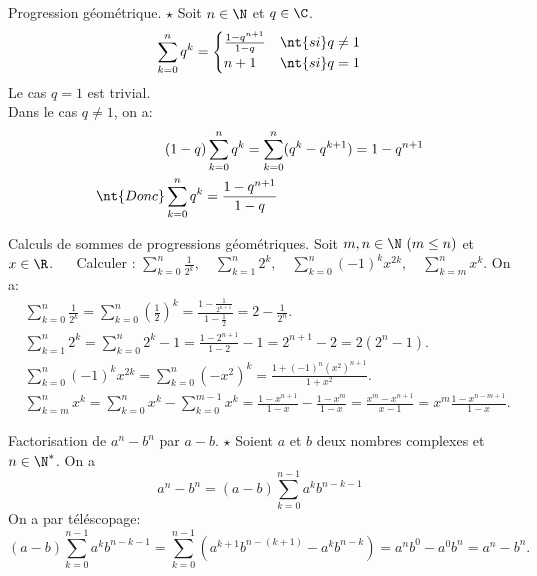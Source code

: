 \documentclass[11pt]{article}
\begin{document}
\begin{prop}{Progression géométrique. $\star$}{}
    Soit $n\in\N$ et $q\in\C$.
    \begin{equation*}
        \sum_{k=0}^nq^k=\begin{cases}
            \frac{1-q^{n+1}}{1-q}&\nt{si }q\neq1\\
            n+1&\nt{si }q=1
        \end{cases}
    \end{equation*}
    \tcblower
    Le cas $q=1$ est trivial.\\
    Dans le cas $q\neq 1$, on a:
    \begin{align*}
        &(1-q)\sum_{k=0}^nq^k=\sum_{k=0}^n(q^k-q^{k+1})=1-q^{n+1}\\
        \nt{Donc }&\sum_{k=0}^nq^k=\frac{1-q^{n+1}}{1-q}
    \end{align*}
\end{prop}

\begin{ex}{Calculs de sommes de progressions géométriques.}{}
    Soit $m,n\in\N~(m\leq n)$ et $x\in\R$. $\quad$ Calculer : \large$\sum\limits_{k=0}^n\frac{1}{2^k},\quad\sum\limits_{k=1}^n2^k,\quad\sum\limits_{k=0}^n(-1)^kx^{2k},\quad\sum\limits_{k=m}^nx^k$.
    \tcblower
    On a:
    \begin{align*}
        &\sum_{k=0}^n\frac{1}{2^k}=\sum_{k=0}^n\left( \frac{1}{2} \right)^k=\frac{1-\frac{1}{2^{n+1}}}{1-\frac{1}{2}}=2-\frac{1}{2^n}.\\
        &\sum_{k=1}^n2^k=\sum_{k=0}^n2^k-1=\frac{1-2^{n+1}}{1-2}-1=2^{n+1}-2=2(2^n-1).\\
        &\sum_{k=0}^n(-1)^kx^{2k}=\sum_{k=0}^n(-x^2)^k=\frac{1+(-1)^n(x^2)^{n+1}}{1+x^2}.\\
        &\sum_{k=m}^nx^k=\sum_{k=0}^nx^k-\sum_{k=0}^{m-1}x^k=\frac{1-x^{n+1}}{1-x}-\frac{1-x^{m}}{1-x}=\frac{x^m-x^{n+1}}{x-1}=x^m\frac{1-x^{n-m+1}}{1-x}.
    \end{align*}
\end{ex}

\begin{prop}{Factorisation de $a^n-b^n$ par $a-b$. $\star$}{}
    Soient $a$ et $b$ deux nombres complexes et $n\in\N^*$. On a
    \begin{equation*}
        a^n-b^n=(a-b)\sum_{k=0}^{n-1}a^{k}b^{n-k-1}
    \end{equation*}
    \tcblower
    On a par téléscopage:
    \begin{equation*}
        (a-b)\sum_{k=0}^{n-1}a^{k}b^{n-k-1}=\sum_{k=0}^{n-1}\left( a^{k+1}b^{n-(k+1)}-a^kb^{n-k} \right)=a^nb^0-a^0b^n=a^n-b^n.
    \end{equation*}
\end{prop}
\end{document}
